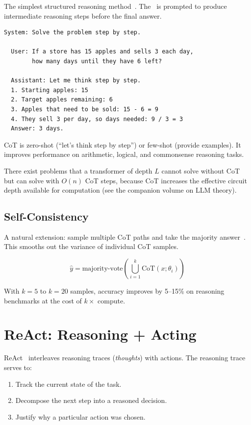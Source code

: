 The simplest structured reasoning method~\cite{wei2022cot}. The \llm\ is prompted to produce intermediate reasoning steps before the final answer.

\begin{lstlisting}[caption=Chain-of-Thought prompt structure]
  System: Solve the problem step by step.

  User: If a store has 15 apples and sells 3 each day,
        how many days until they have 6 left?

  Assistant: Let me think step by step.
  1. Starting apples: 15
  2. Target apples remaining: 6
  3. Apples that need to be sold: 15 - 6 = 9
  4. They sell 3 per day, so days needed: 9 / 3 = 3
  Answer: 3 days.
\end{lstlisting}

CoT is zero-shot (``let's think step by step'') or few-shot (provide examples). It improves performance on arithmetic, logical, and commonsense reasoning tasks.

\begin{theorem}
	There exist problems that a transformer of depth $L$ cannot solve without CoT but can solve with $O(n)$ CoT steps, because CoT increases the effective circuit depth available for computation (see the companion volume on LLM theory).
\end{theorem}

\subsection{Self-Consistency}

A natural extension: sample multiple CoT paths and take the majority answer~\cite{wang2023selfconsistency}. This smooths out the variance of individual CoT samples.

\begin{equation}
	\hat{y} = \text{majority-vote}\left(\bigcup_{i=1}^k \text{CoT}(x; \theta_i)\right)
\end{equation}

With $k=5$ to $k=20$ samples, accuracy improves by 5--15\% on reasoning benchmarks at the cost of $k \times$ compute.

\section{ReAct: Reasoning + Acting}

ReAct~\cite{yao2023react} interleaves reasoning traces (\emph{thoughts}) with actions. The reasoning trace serves to:
\begin{enumerate}
	\item Track the current state of the task.
	\item Decompose the next step into a reasoned decision.
	\item Justify why a particular action was chosen.
\end{enumerate}

